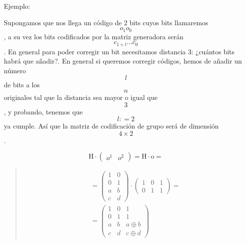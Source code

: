 \begin{enumerate}
\begin{enumerate}
\begin{enumerate}
\begin{enumerate}
        Ejemplo:

        Supongamos que nos llega un código de 2 bits cuyos bits
        llamaremos \[o_{1}o_{0}\], a su vez los bits codificados por la
        matriz generadora serán\[c_{1 + l}\ldots c_{0}\]. En general
        para poder corregir un bit necesitamos distancia 3: ¿cuántos
        bits habrá que añadir?. En general si queremos corregir códigos,
        hemos de añadir un número \[l\]de bits a los \[n\] originales
        tal que la distancia sea mayor o igual que\[3\], y probando,
        tenemos que \[l{: = 2}\] ya cumple. Así que la matriz de
        codificación de grupo será de dimensión\[4 \times 2\].

        \[{{\mathtt{\mathrm{H}} \cdot \begin{pmatrix}
        o^{1} & o^{2}
        \end{pmatrix}} = {\mathtt{\mathrm{H}} \cdot \mathtt{\mathrm{o}}}} =\]
      \end{enumerate}
    \end{enumerate}
  \end{enumerate}
\end{enumerate}

\begin{quote}
\[\begin{matrix}
{{= {\begin{pmatrix}
1 & 0 \\
0 & 1 \\
a & b \\
c & d
\end{pmatrix} \cdot \begin{pmatrix}
1 & 0 & 1 \\
0 & 1 & 1
\end{pmatrix}}} =} \\
{= \begin{pmatrix}
1 & 0 & 1 \\
0 & 1 & 1 \\
a & b & {a \oplus b} \\
c & d & {c \oplus d}
\end{pmatrix}}
\end{matrix}\]
\end{quote}

